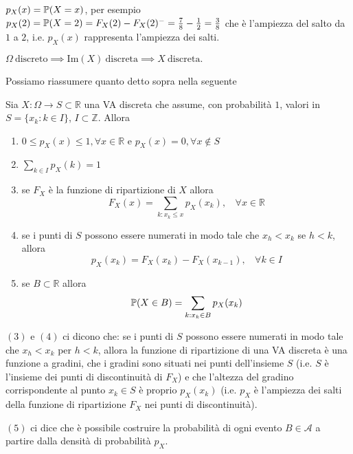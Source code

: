 $p_{X}( x) =\mathbb{P}( X=x)$, per esempio $p_{X}( 2) =\mathbb{P}( X=2) =F_{X}( 2) -F_{X}( 2)^{-} =\frac{7}{8} -\frac{1}{2} =\frac{3}{8}$ che è l'ampiezza del salto da $1$ a $2$, i.e. $p_{X}( x)$ rappresenta l'ampiezza dei salti.
\begin{oss}
$\Omega \ \text{discreto} \implies \mathrm{Im}( X) \ \text{discreta} \implies X\ \text{discreta} .$
\end{oss}
Possiamo riassumere quanto detto sopra nella seguente
\begin{theorem}
Sia $X:\Omega \rightarrow S\subset \mathbb{R}$ una VA discreta che assume, con probabilità $1$, valori in $S=\{x_{k} :k\in I\}$, $I\subset \mathbb{Z}$. Allora
\end{theorem}
\begin{enumerate}
\item $0\leq p_{X}( x) \leq 1,\forall x\in \mathbb{R}$ e $p_{X}( x) =0,\forall x\notin S$
\item $\sum\limits _{k\in I} p_{X}( k) =1$
\item se $F_{X}$ è la funzione di ripartizione di $X$ allora\begin{equation*}
F_{X}( x) =\sum\limits _{k:x_{k} \leq x} p_{X}( x_{k}) ,\ \ \ \ \forall x\in \mathbb{R}
\end{equation*}
\item se i punti di $S$ possono essere numerati in modo tale che $x_{h} < x_{k}$ se $h< k$, allora\begin{equation*}
p_{X}( x_{k}) =F_{X}( x_{k}) -F_{X}( x_{k-1}) ,\ \ \ \ \forall k\in I
\end{equation*}
\item se $B\subset \mathbb{R}$ allora\begin{equation*}
\mathbb{P}( X\in B) =\sum\limits _{k:x_{k} \in B} p_{X}( x_{k})
\end{equation*}
\end{enumerate}
\begin{oss}
$( 3)$ e $( 4)$ ci dicono che: se i punti di $S$ possono essere numerati in modo tale che $x_{h} < x_{k}$ per $h< k$, allora la funzione di ripartizione di una VA discreta è una funzione a gradini, che i gradini sono situati nei punti dell'insieme $S$ (i.e. $S$ è l'insieme dei punti di discontinuità di $F_{X}$) e che l'altezza del gradino corrispondente al punto $x_{k} \in S$ è proprio $p_{X}( x_{k})$ (i.e. $p_{X}$ è l'ampiezza dei salti della funzione di ripartizione $F_{X}$ nei punti di discontinuità).

$( 5)$ ci dice che è possibile costruire la probabilità di ogni evento $B\in \mathcal{A}$ a partire dalla densità di probabilità $p_{X}$.
\end{oss}

